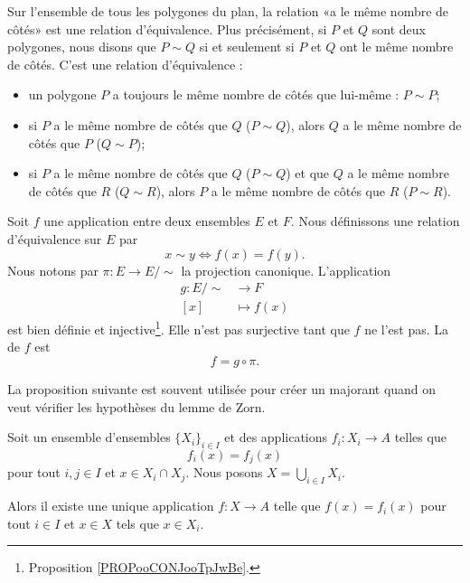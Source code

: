\begin{example}     \label{EXooYDRVooHsANlC}
	Sur l'ensemble de tous les polygones du plan, la relation «a le même nombre de côtés» est une relation d'équivalence. Plus précisément, si \( P\) et \( Q\) sont deux polygones, nous disons que \( P\sim Q\) si et seulement si \( P\) et \( Q\) ont le même nombre de côtés. C'est une relation d'équivalence :
	\begin{itemize}
		\item
		      un polygone \( P\) a toujours le même nombre de côtés que lui-même : \( P\sim P\);
		\item
		      si \( P\) a le même nombre de côtés que \( Q\) (\( P\sim Q\)), alors \( Q\) a le même nombre de côtés que \( P\) (\( Q\sim P\));
		\item
		      si \( P\) a le même nombre de côtés que \( Q\) (\( P\sim Q\)) et que \( Q\) a le même nombre de côtés que \( R\) (\( Q\sim R\)), alors \( P\) a le même nombre de côtés que \( R\) (\( P\sim R\)).
	\end{itemize}
\end{example}

\begin{example}\label{EXooProjCanoniqueEquivAppl}
	Soit \( f\) une application entre deux ensembles \( E\) et \( F\). Nous définissons une relation d'équivalence sur \( E\) par
	\begin{equation}
		x\sim y\Leftrightarrow f(x)=f(y).
	\end{equation}
	Nous notons par \( \pi\colon E\to E/\sim\) la projection canonique. L'application
	\begin{equation}
		\begin{aligned}
			g\colon E/\sim & \to F        \\
			[x]            & \mapsto f(x)
		\end{aligned}
	\end{equation}
	est bien définie et injective\footnote{Proposition \ref{PROPooCONJooTpJwBe}.}. Elle n'est pas surjective tant que \( f\) ne l'est pas. La  de \( f\) est
	\begin{equation}
		f=g\circ\pi.
	\end{equation}
\end{example}

La proposition suivante est souvent utilisée pour créer un majorant quand on veut vérifier les hypothèses du lemme de Zorn.

\begin{proposition}	\label{PROPooKXBGooJYUbtF}
	Soit un ensemble d'ensembles \( \{ X_i \}_{i\in I}\) et des applications \(f_i \colon X_i\to A  \) telles que
	\begin{equation}
		f_i(x)=f_j(x)
	\end{equation}
	pour tout \( i,j\in I\) et \( x\in X_i\cap X_j\). Nous posons \( X=\bigcup_{i\in I}X_i\).

	Alors il existe une unique application \(f \colon X\to A  \) telle que \( f(x)=f_i(x)\) pour tout \( i\in I\) et \( x\in X\) tels que \( x\in X_i\).
\end{proposition}

